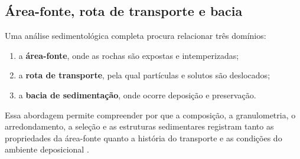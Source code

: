 \subsection{Área-fonte, rota de transporte e bacia}

Uma análise sedimentológica completa procura relacionar três domínios:

\begin{enumerate}
  \item a \textbf{área-fonte}, onde as rochas são expostas e intemperizadas;
  \item a \textbf{rota de transporte}, pela qual partículas e solutos são deslocados;
  \item a \textbf{bacia de sedimentação}, onde ocorre deposição e preservação.
\end{enumerate}

Essa abordagem permite compreender por que a composição, a granulometria, o
arredondamento, a seleção e as estruturas sedimentares registram tanto as propriedades
da área-fonte quanto a história do transporte e as condições do ambiente deposicional
\parencite{nichols2009}.

